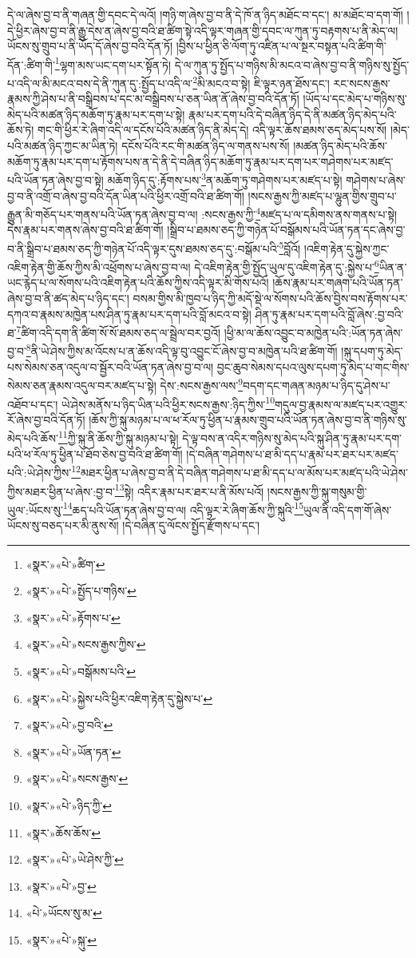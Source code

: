 དེ་ལ་ཞེས་བྱ་བ་ནི་གཞན་གྱི་དབང་དེ་ལའོ། །གཉི་ག་ཞེས་བྱ་བ་ནི་དེ་ཁོ་ན་ཉིད་མཐོང་བ་དང་། མ་མཐོང་བ་དག་གོ། །དེ་ཕྱིར་ཞེས་བྱ་བ་ནི་རྒྱུ་དེས་ན་ཞེས་བྱ་བའི་ཐ་ཚིག་སྟེ་འདི་ལྟར་གཞན་གྱི་དབང་ལ་ཀུན་ཏུ་བརྟགས་པ་ནི་མེད་ལ། ཡོངས་སུ་གྲུབ་པ་ནི་ཡོད་དོ་ཞེས་བྱ་བའི་དོན་ཏོ། །བྱིས་པ་ཕྱིན་ཅི་ལོག་ཏུ་འཛིན་པ་ལ་སྔར་བསྟན་པའི་ཚིག་གི་དོན་:ཚིག་གི་\footnote{«སྣར་»«པེ་»ཚིག་}ལྷག་མས་ཡང་དག་པར་སྟོན་ཏེ། དེ་ལ་ཀུན་ཏུ་སྤྱོད་པ་གཉིས་མི་མངའ་བ་ཞེས་བྱ་བ་ནི་གཉིས་སུ་སྤྱོད་པ་འདི་ལ་མི་མངའ་བས་དེ་ནི་ཀུན་དུ་:སྤྱོད་པ་འདི་ལ་\footnote{«སྣར་»«པེ་»སྤྱོད་པ་གཉིས་}མི་མངའ་བ་སྟེ། ཇི་ལྟར་ཉན་ཐོས་དང་། རང་སངས་རྒྱས་རྣམས་ཀྱི་ཤེས་པ་ནི་བསྒྲིབས་པ་དང་མ་བསྒྲིབས་པ་ཅན་ཡིན་ནོ་ཞེས་བྱ་བའི་དོན་ཏོ། །ཡོད་པ་དང་མེད་པ་གཉིས་སུ་མེད་པའི་མཚན་ཉིད་མཆོག་ཏུ་རྣམ་པར་དག་པ་སྟེ། རྣམ་པར་དག་པའི་དེ་བཞིན་ཉིད་དེ་ནི་མཚན་ཉིད་མེད་པའི་ཆོས་ཏེ། གང་གི་ཕྱིར་རེ་ཞིག་འདི་ལ་དངོས་པོའི་མཚན་ཉིད་ནི་མེད་དེ། འདི་ལྟར་ཆོས་ཐམས་ཅད་མེད་པས་སོ། །མེད་པའི་མཚན་ཉིད་ཀྱང་མ་ཡིན་ཏེ། དངོས་པོའི་རང་གི་མཚན་ཉིད་ལ་གནས་པས་སོ། །མཚན་ཉིད་མེད་པའི་ཆོས་མཆོག་ཏུ་རྣམ་པར་དག་པ་རྟོགས་པས་ན་དེ་ནི་དེ་བཞིན་ཉིད་མཆོག་ཏུ་རྣམ་པར་དག་པར་གཤེགས་པར་མཛད་པའི་ཡོན་ཏན་ཞེས་བྱ་བ་སྟེ། མཆོག་ཉིད་དུ་:རྟོགས་པས་\footnote{«སྣར་»«པེ་»རྟོགས་པ་}ན་མཆོག་ཏུ་གཤེགས་པར་མཛད་པ་སྟེ། གཤེགས་པ་ཞེས་བྱ་བ་ནི་འགྲོ་བ་ཞེས་བྱ་བའི་དོན་ཡིན་པའི་ཕྱིར་འགྲོ་བའི་ཐ་ཚིག་གོ། །སངས་རྒྱས་ཀྱི་མཛད་པ་ལྷུན་གྱིས་གྲུབ་པ་རྒྱུན་མི་གཅོད་པར་གནས་པའི་ཡོན་ཏན་ཞེས་བྱ་བ་ལ། :སངས་རྒྱས་ཀྱི་\footnote{«སྣར་»«པེ་»སངས་རྒྱས་ཀྱིས་}མཛད་པ་ལ་དམིགས་ནས་གནས་པ་སྟེ། དེས་རྣམ་པར་གནས་ཞེས་བྱ་བའི་ཐ་ཚིག་གོ། །སྒྲིབ་པ་ཐམས་ཅད་ཀྱི་གཉེན་པོ་བསྒོམས་པའི་ཡོན་ཏན་དང་ཞེས་བྱ་བ་ནི་སྒྲིབ་པ་ཐམས་ཅད་ཀྱི་གཉེན་པོ་འདི་ལྟར་དུས་ཐམས་ཅད་དུ་:བསྒོམ་པའི་\footnote{«སྣར་»«པེ་»བསྒོམས་པའི་}བློའོ། །འཇིག་རྟེན་དུ་སྐྱེས་ཀྱང་འཇིག་རྟེན་གྱི་ཆོས་ཀྱིས་མི་འཕྲོགས་པ་ཞེས་བྱ་བ་ལ། དེ་འཇིག་རྟེན་གྱི་སྤྱོད་ཡུལ་དུ་འཇིག་རྟེན་དུ་:སྐྱེས་པ་\footnote{«སྣར་»«པེ་»སྐྱེས་པའི་ཕྱིར་འཇིག་རྟེན་དུ་སྐྱེས་པ་}ཡིན་ན་ཡང་རྙེད་པ་ལ་སོགས་པའི་འཇིག་རྟེན་པའི་ཆོས་ཀྱིས་འདི་ལྟར་མི་གོས་པའོ། །ཆོས་རྣམ་པར་གཞག་པའི་ཡོན་ཏན་ཞེས་བྱ་བ་ནི་ཚད་མེད་པ་ཉིད་དང་། བསམ་གྱིས་མི་ཁྱབ་པ་ཉིད་ཀྱི་མདོ་སྡེ་ལ་སོགས་པའི་ཆོས་བྱིས་བས་རྟོགས་པར་དཀའ་བ་རྣམས་མཁྱེན་པས་ཤིན་ཏུ་རྣམ་པར་དག་པའི་བློ་མངའ་བ་སྟེ། ཤིན་ཏུ་རྣམ་པར་དག་པའི་བློ་ཞེས་:བྱ་བའི་ཐ་\footnote{«སྣར་»«པེ་»བྱ་བའི་}ཚིག་འདི་དག་ནི་ཚིག་སོ་སོ་ཐམས་ཅད་ལ་སྦྲེལ་བར་བྱའོ། །ཕྱི་མ་ལ་ཆོས་འབྱུང་བ་མཁྱེན་པའི་:ཡོན་ཏན་ཞེས་བྱ་བ་\footnote{«སྣར་»«པེ་»ཡོན་ཏན་}ནི་ཡེ་ཤེས་ཀྱིས་མ་འོངས་པ་ན་ཆོས་འདི་ལྟ་བུ་འབྱུང་ངོ་ཞེས་བྱ་བ་མཁྱེན་པའི་ཐ་ཚིག་གོ། །སྐུ་དཔག་ཏུ་མེད་པས་སེམས་ཅན་འདུལ་བ་སྦྱོར་བའི་ཡོན་ཏན་ཞེས་བྱ་བ་ལ། བྱང་ཆུབ་སེམས་དཔའ་ལུས་དཔག་ཏུ་མེད་པ་གང་གིས་སེམས་ཅན་རྣམས་འདུལ་བར་མཛད་པ་སྟེ། དེས་:སངས་རྒྱས་ལས་\footnote{«སྣར་»«པེ་»སངས་རྒྱས་}བདག་དང་གཞན་མཉམ་པ་ཉིད་དུ་ཤེས་པ་འཐོབ་པ་དང་། ཡེ་ཤེས་མནོས་པ་ཉིད་ཡིན་པའི་ཕྱིར་སངས་རྒྱས་:ཉིད་ཀྱིས་\footnote{«སྣར་»«པེ་»ཉིད་ཀྱི་}གདུལ་བྱ་རྣམས་ལ་མཛད་པར་འགྱུར་རོ་ཞེས་བྱ་བའི་དོན་ཏོ། །ཆོས་ཀྱི་སྐུ་མཉམ་པ་ལ་ཕ་རོལ་ཏུ་ཕྱིན་པ་རྣམས་གྲུབ་པའི་ཡོན་ཏན་ཞེས་བྱ་བ་ནི་གཉིས་སུ་མེད་པའི་ཆོས་\footnote{«སྣར་»ཆོས་ཆོས་}ཀྱི་སྐུ་ནི་ཆོས་ཀྱི་སྐུ་མཉམ་པ་སྟེ། དེ་ལྟ་བས་ན་འདིར་གཉིས་སུ་མེད་པའི་སྐུ་ཤིན་ཏུ་རྣམ་པར་དག་པའི་ཕ་རོལ་ཏུ་ཕྱིན་པ་ཐོབ་ཅེས་བྱ་བའི་ཐ་ཚིག་གོ། །དེ་བཞིན་གཤེགས་པ་ཐ་མི་དད་པ་རྣམ་པར་ཐར་པར་མཛད་པའི་:ཡེ་ཤེས་ཀྱིས་\footnote{«སྣར་»«པེ་»ཡེ་ཤེས་ཀྱི་}མཐར་ཕྱིན་པ་ཞེས་བྱ་བ་ནི་དེ་བཞིན་གཤེགས་པ་ཐ་མི་དད་པ་ལ་མོས་པར་མཛད་པའི་ཡེ་ཤེས་ཀྱིས་མཐར་ཕྱིན་པ་ཞེས་:བྱ་བ་\footnote{«སྣར་»«པེ་»བྱ་}སྟེ། འདིར་རྣམ་པར་ཐར་པ་ནི་མོས་པའོ། །སངས་རྒྱས་ཀྱི་སྐུ་གསུམ་གྱི་ཡུལ་:ཡོངས་སུ་\footnote{«པེ་»ཡོངས་སུ་མ་}ཆད་པའི་ཡོན་ཏན་ཞེས་བྱ་བ་ལ། འདི་ལྟར་རེ་ཞིག་ཆོས་ཀྱི་སྐུའི་\footnote{«སྣར་»«པེ་»སྐུ་}ཡུལ་ནི་འདི་དག་གོ་ཞེས་ཡོངས་སུ་བཅད་པར་མི་ནུས་སོ། །དེ་བཞིན་དུ་ལོངས་སྤྱོད་རྫོགས་པ་དང་། 